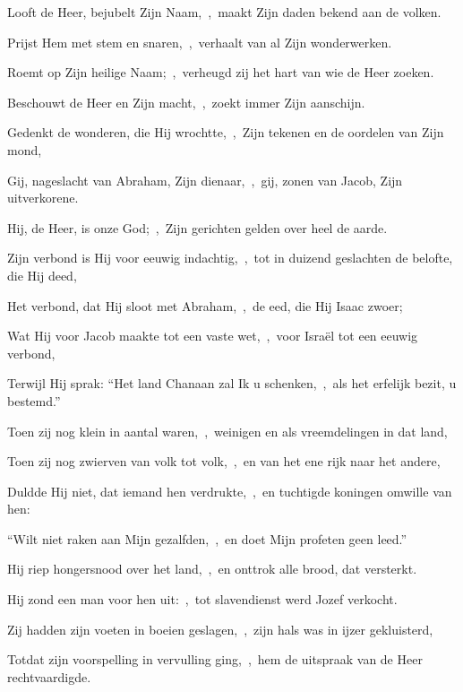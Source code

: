 \documentclass[12pt,twoside,a5paper]{article}
\begin{document}
\begin{halfparskip}

   Looft de Heer, bejubelt Zijn Naam,~\sep\ maakt Zijn daden bekend aan de volken.


  Prijst Hem met stem en snaren,~\sep\ verhaalt van al Zijn wonderwerken.

  Roemt op Zijn heilige Naam;~\sep\ verheugd zij het hart van wie de Heer zoeken.

  Beschouwt de Heer en Zijn macht,~\sep\ zoekt immer Zijn aanschijn.

  Gedenkt de wonderen, die Hij wrochtte,~\sep\ Zijn tekenen en de oordelen van Zijn mond,

  Gij, nageslacht van Abraham, Zijn dienaar,~\sep\ gij, zonen van Jacob, Zijn uitverkorene.

  Hij, de Heer, is onze God;~\sep\ Zijn gerichten gelden over heel de aarde.

  Zijn verbond is Hij voor eeuwig indachtig,~\sep\ tot in duizend geslachten de belofte, die Hij deed,

  Het verbond, dat Hij sloot met Abraham,~\sep\ de eed, die Hij Isaac zwoer;

  Wat Hij voor Jacob maakte tot een vaste wet,~\sep\ voor Israël tot een eeuwig verbond,

  Terwijl Hij sprak: ``Het land Chanaan zal Ik u schenken,~\sep\ als het erfelijk bezit, u bestemd.''

  Toen zij nog klein in aantal waren,~\sep\ weinigen en als vreemdelingen in dat land,

  Toen zij nog zwierven van volk tot volk,~\sep\ en van het ene rijk naar het andere,

  Duldde Hij niet, dat iemand hen verdrukte,~\sep\ en tuchtigde koningen omwille van hen:

  ``Wilt niet raken aan Mijn gezalfden,~\sep\ en doet Mijn profeten geen leed.''

  Hij riep hongersnood over het land,~\sep\ en onttrok alle brood, dat versterkt.

  Hij zond een man voor hen uit:~\sep\ tot slavendienst werd Jozef verkocht.

  Zij hadden zijn voeten in boeien geslagen,~\sep\ zijn hals was in ijzer gekluisterd,

  Totdat zijn voorspelling in vervulling ging,~\sep\ hem de uitspraak van de Heer rechtvaardigde.


\end{halfparskip}
\end{document}
